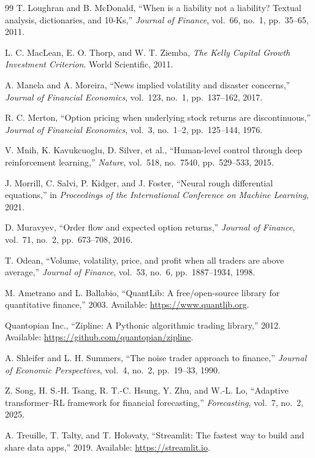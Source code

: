 \documentclass[10pt,twocolumn]{article}
\begin{document}
\begin{thebibliography}{99}
T. Loughran and B. McDonald,
``When is a liability not a liability? Textual analysis, dictionaries, and 10-Ks,''
\textit{Journal of Finance}, vol.~66, no.~1, pp.~35--65, 2011.

L. C. MacLean, E. O. Thorp, and W. T. Ziemba,
\textit{The Kelly Capital Growth Investment Criterion}.
World Scientific, 2011.

A. Manela and A. Moreira,
``News implied volatility and disaster concerns,''
\textit{Journal of Financial Economics}, vol.~123, no.~1, pp.~137--162, 2017.

R. C. Merton,
``Option pricing when underlying stock returns are discontinuous,''
\textit{Journal of Financial Economics}, vol.~3, no.~1--2, pp.~125--144, 1976.

V. Mnih, K. Kavukcuoglu, D. Silver, et al.,
``Human-level control through deep reinforcement learning,''
\textit{Nature}, vol.~518, no.~7540, pp.~529--533, 2015.

J. Morrill, C. Salvi, P. Kidger, and J. Foster,
``Neural rough differential equations,''
in \textit{Proceedings of the International Conference on Machine Learning}, 2021.

D. Muravyev,
``Order flow and expected option returns,''
\textit{Journal of Finance}, vol.~71, no.~2, pp.~673--708, 2016.

T. Odean,
``Volume, volatility, price, and profit when all traders are above average,''
\textit{Journal of Finance}, vol.~53, no.~6, pp.~1887--1934, 1998.

M. Ametrano and L. Ballabio,
``QuantLib: A free/open-source library for quantitative finance,''
2003. Available: \url{https://www.quantlib.org}.

Quantopian Inc.,
``Zipline: A Pythonic algorithmic trading library,''
2012. Available: \url{https://github.com/quantopian/zipline}.

A. Shleifer and L. H. Summers,
``The noise trader approach to finance,''
\textit{Journal of Economic Perspectives}, vol.~4, no.~2, pp.~19--33, 1990.

Z. Song, H. S.-H. Tsang, R. T.-C. Hsung, Y. Zhu, and W.-L. Lo,
``Adaptive transformer--RL framework for financial forecasting,''
\textit{Forecasting}, vol.~7, no.~2, 2025.

A. Treuille, T. Talty, and T. Holovaty,
``Streamlit: The fastest way to build and share data apps,''
2019. Available: \url{https://streamlit.io}.


\end{thebibliography}
\end{document}
